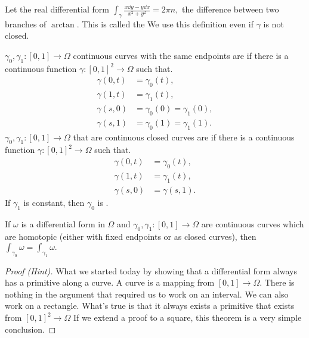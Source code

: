 \documentclass[a4paper,12pt]{article}
\begin{document}
Let the real differential form $\int_\gamma\frac{x\dd y-y\dd x}{x^2+y^2}=2\pi n,$ the difference between two branches of $\arctan.$ This is called the  We use this definition even if $\gamma$ is not closed.

\begin{definition}[Homotopy]
    $\gamma_0,\gamma_1:[0,1]\to\Omega$ continuous curves with the same endpoints are  if there is a continuous function $\gamma:[0,1]^2\to\Omega$ such that.\begin{align}
        \gamma(0,t)&=\gamma_0(t),\\
        \gamma(1,t)&=\gamma_1(t),\\
        \gamma(s,0)&=\gamma_0(0)=\gamma_1(0),\\
        \gamma(s,1)&=\gamma_0(1)=\gamma_1(1).
    \end{align}
    $\gamma_0,\gamma_1:[0,1]\to\Omega$ that are continuous closed curves are  if there is a continuous function $\gamma:[0,1]^2\to\Omega$ such that.\begin{align}
        \gamma(0,t)&=\gamma_0(t),\\
        \gamma(1,t)&=\gamma_1(t),\\
        \gamma(s,0)&=\gamma(s,1).
    \end{align}
    If $\gamma_1$ is constant, then $\gamma_0$ is .
\end{definition}
\begin{theorem}
    If $\omega$ is a differential form in $\Omega$ and $\gamma_0,\gamma_1:[0,1]\to\Omega$ are continuous curves which are homotopic (either with fixed endpoints or as closed curves), then $\int_{\gamma_0}\omega=\int_{\gamma_1}\omega.$
    \begin{proof}[Proof (Hint)]
        What we started today by showing that a differential form always has a primitive along a curve. A curve is a mapping from $[0,1]\to\Omega.$ There is nothing in the argument that required us to work on an interval. We can also work on a rectangle. What's true is that it always exists a primitive that exists from $[0,1]^2\to\Omega$ If we extend a proof to a square, this theorem is a very simple conclusion.
    \end{proof}
\end{theorem}
\end{document}
